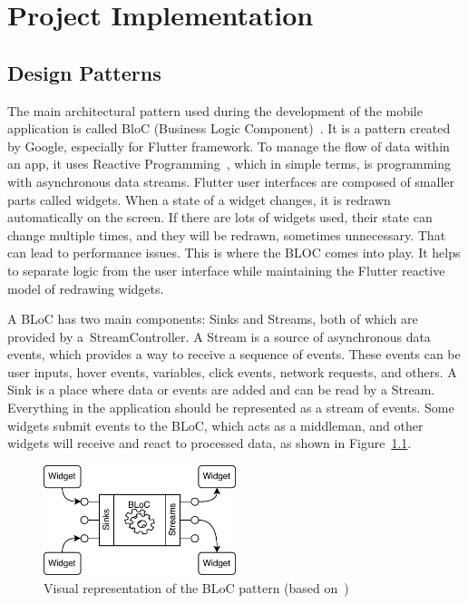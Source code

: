 \chapter{Project Implementation}
\section{Design Patterns}
The main architectural pattern used during the development of the mobile application is called BloC (Business Logic Component)~\cite{bloc-pattern}. It is a pattern created by Google, especially for Flutter framework. To manage the flow of data within an app, it uses Reactive Programming~\cite{reactive-programming}, which in simple terms, is programming with asynchronous data streams. Flutter user interfaces are composed of smaller parts called widgets. When a state of a widget changes, it is redrawn automatically on the screen. If there are lots of widgets used, their state can change multiple times, and they will be redrawn, sometimes unnecessary. That can lead to performance issues. This is where the BLOC comes into play. It helps to separate logic from the user interface while maintaining the Flutter reactive model of redrawing widgets.

A BLoC has two main components: Sinks and Streams, both of which are provided by a~StreamController. A Stream is a source of asynchronous data events, which provides a way to receive a sequence of events. These events can be user inputs, hover events, variables, click events, network requests, and others. A Sink is a place where data or events are added and can be read by a Stream. Everything in the application should be represented as a stream of events. Some widgets submit events to the BLoC, which acts as a middleman, and other widgets will receive and react to processed data, as shown in Figure~\ref{fig:bloc-pattern}.

\begin{figure}[htb]
    \centering
    \includegraphics[width=0.5\textwidth]{fig04/bloc_pattern.pdf}
    \caption{Visual representation of the BLoC pattern (based on~\cite{bloc-image})} \label{fig:bloc-pattern}
\end{figure}

